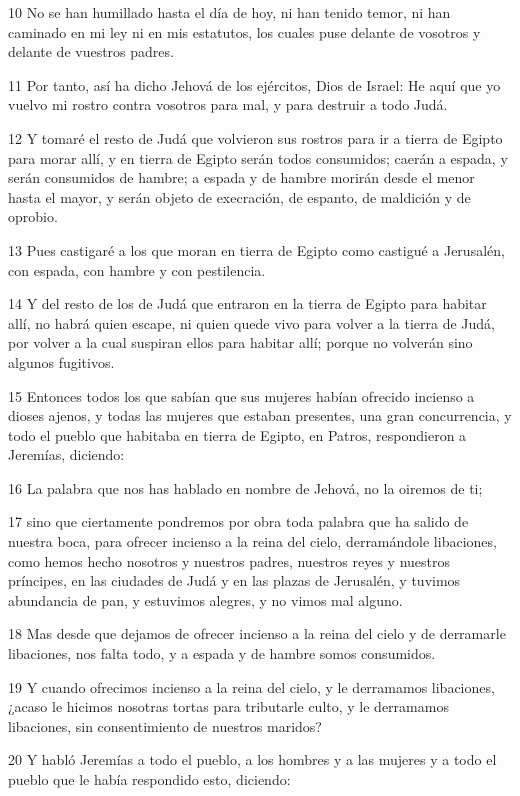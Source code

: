 \par 10 No se han humillado hasta el día de hoy, ni han tenido temor, ni han caminado en mi ley ni en mis estatutos, los cuales puse delante de vosotros y delante de vuestros padres.
\par 11 Por tanto, así ha dicho Jehová de los ejércitos, Dios de Israel: He aquí que yo vuelvo mi rostro contra vosotros para mal, y para destruir a todo Judá.
\par 12 Y tomaré el resto de Judá que volvieron sus rostros para ir a tierra de Egipto para morar allí, y en tierra de Egipto serán todos consumidos; caerán a espada, y serán consumidos de hambre; a espada y de hambre morirán desde el menor hasta el mayor, y serán objeto de execración, de espanto, de maldición y de oprobio.
\par 13 Pues castigaré a los que moran en tierra de Egipto como castigué a Jerusalén, con espada, con hambre y con pestilencia.
\par 14 Y del resto de los de Judá que entraron en la tierra de Egipto para habitar allí, no habrá quien escape, ni quien quede vivo para volver a la tierra de Judá, por volver a la cual suspiran ellos para habitar allí; porque no volverán sino algunos fugitivos.
\par 15 Entonces todos los que sabían que sus mujeres habían ofrecido incienso a dioses ajenos, y todas las mujeres que estaban presentes, una gran concurrencia, y todo el pueblo que habitaba en tierra de Egipto, en Patros, respondieron a Jeremías, diciendo:
\par 16 La palabra que nos has hablado en nombre de Jehová, no la oiremos de ti;
\par 17 sino que ciertamente pondremos por obra toda palabra que ha salido de nuestra boca, para ofrecer incienso a la reina del cielo, derramándole libaciones, como hemos hecho nosotros y nuestros padres, nuestros reyes y nuestros príncipes, en las ciudades de Judá y en las plazas de Jerusalén, y tuvimos abundancia de pan, y estuvimos alegres, y no vimos mal alguno.
\par 18 Mas desde que dejamos de ofrecer incienso a la reina del cielo y de derramarle libaciones, nos falta todo, y a espada y de hambre somos consumidos.
\par 19 Y cuando ofrecimos incienso a la reina del cielo, y le derramamos libaciones, ¿acaso le hicimos nosotras tortas para tributarle culto, y le derramamos libaciones, sin consentimiento de nuestros maridos?
\par 20 Y habló Jeremías a todo el pueblo, a los hombres y a las mujeres y a todo el pueblo que le había respondido esto, diciendo:
